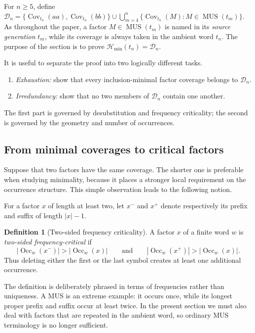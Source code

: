 \documentclass[10pt,a4paper]{article}
\theoremstyle{definition}\newtheorem{definition}[theorem]{Definition}
\theoremstyle{remark}\newtheorem{remark}[theorem]{Remark}
\newcommand{\Occ}{\operatorname{Occ}}
\newcommand{\Cov}{\operatorname{Cov}}
\newcommand{\MUS}{\operatorname{MUS}}
\newcommand{\Hmin}{\mathcal{H}_{\min}}
\begin{document}
For $n\ge5$, define
$
 \mathcal D_n=
 \{\Cov_{t_n}(aa),\Cov_{t_n}(bb)\}
 \cup
 \bigcup_{m=4}^{n}
 \{\Cov_{t_n}(M):M\in\MUS(t_m)\}.
$
As throughout the paper, a factor $M\in\MUS(t_m)$ is named in its \emph{source generation} $t_m$, while its coverage is always taken in the ambient word $t_n$.  The purpose of the section is to prove
$
 \Hmin(t_n)=\mathcal D_n.
$

It is useful to separate the proof into two logically different tasks.
\begin{enumerate}[label=(\arabic*),leftmargin=*]
\item \emph{Exhaustion:} show that every inclusion-minimal factor coverage belongs to $\mathcal D_n$.
\item \emph{Irredundancy:} show that no two members of $\mathcal D_n$ contain one another.
\end{enumerate}
The first part is governed by desubstitution and frequency criticality; the second is governed by the geometry and number of occurrences.

\subsection{From minimal coverages to critical factors}
\label{subsec:critical-representatives}

Suppose that two factors have the same coverage.  The shorter one is preferable when studying minimality, because it places a stronger local requirement on the occurrence structure.  This simple observation leads to the following notion.

For a factor $x$ of length at least two, let $x^-$ and $x^+$ denote respectively its prefix and suffix of length $|x|-1$.

\begin{definition}[Two-sided frequency criticality]
A factor $x$ of a finite word $w$ is \emph{two-sided frequency-critical} if
\[
 |\Occ_w(x^-)|>|\Occ_w(x)|
 \qquad\text{and}\qquad
 |\Occ_w(x^+)|>|\Occ_w(x)|.
\]
Thus deleting either the first or the last symbol creates at least one additional occurrence.
\end{definition}

The definition is deliberately phrased in terms of frequencies rather than uniqueness.  A MUS is an extreme example: it occurs once, while its longest proper prefix and suffix occur at least twice.  In the present section we must also deal with factors that are repeated in the ambient word, so ordinary MUS terminology is no longer sufficient.
\end{document}

